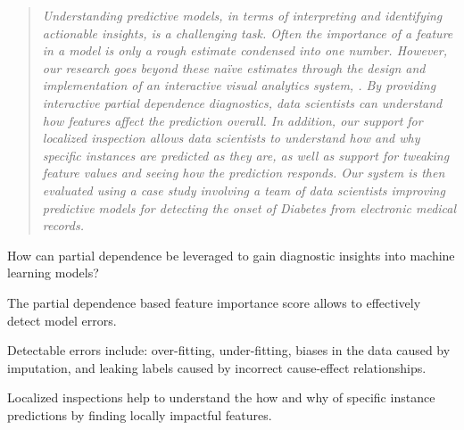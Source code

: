 \begin{quote}\textit{
Understanding predictive models, in terms of interpreting and identifying actionable
insights, is a challenging task.
Often the importance of a feature in a model is only a rough estimate
condensed into one number.  However, our research goes beyond these na\"ive estimates through the design and implementation of an interactive visual analytics system,
\prospector. By providing interactive partial dependence diagnostics, data scientists can understand how features affect the prediction overall.  In addition, our support for localized inspection allows data scientists to understand how and why specific instances are predicted as they are, as well as support for  tweaking feature values and seeing how the prediction responds.  Our system is then evaluated using a case study involving a team of data scientists improving predictive models for detecting the onset of Diabetes from electronic medical records.
}\end{quote}

\begin{contributions}{How can partial dependence be leveraged to gain diagnostic insights into machine learning models?}
\item The partial dependence based feature importance score allows to effectively detect model errors.
\item Detectable errors include: over-fitting, under-fitting, biases in the data caused by imputation, and leaking labels caused by incorrect cause-effect relationships.
\item Localized inspections help to understand the how and why of specific instance predictions by finding locally impactful features.
\end{contributions}

